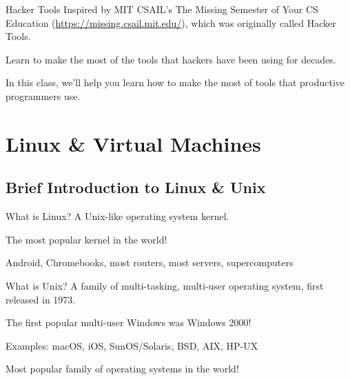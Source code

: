 \documentclass[12pt]{beamer}
\begin{document}
\begin{frame}{Hacker Tools}
  Inspired by MIT CSAIL's The Missing Semester of Your CS Education (\url{https://missing.csail.mit.edu/}), which was originally called Hacker Tools.

  Learn to make the most of the tools that hackers have been using for decades.

  In this class, we'll help you learn how to make the most of tools that productive programmers use.
\end{frame}

\section{Linux \& Virtual Machines}
\subsection{Brief Introduction to Linux \& Unix}

\begin{frame}{What is Linux?}
  A Unix-like operating system kernel.

  The most popular kernel in the world!

  Android, Chromebooks, most routers, most servers, supercomputers
\end{frame}

\begin{frame}{What is Unix?}
  A family of multi-tasking, multi-user operating system, first released in 1973.

  The first popular multi-user Windows was Windows 2000!

  Examples: macOS, iOS, SunOS/Solaris, BSD, AIX, HP-UX

  Most popular family of operating systems in the world!
\end{frame}
\end{document}
